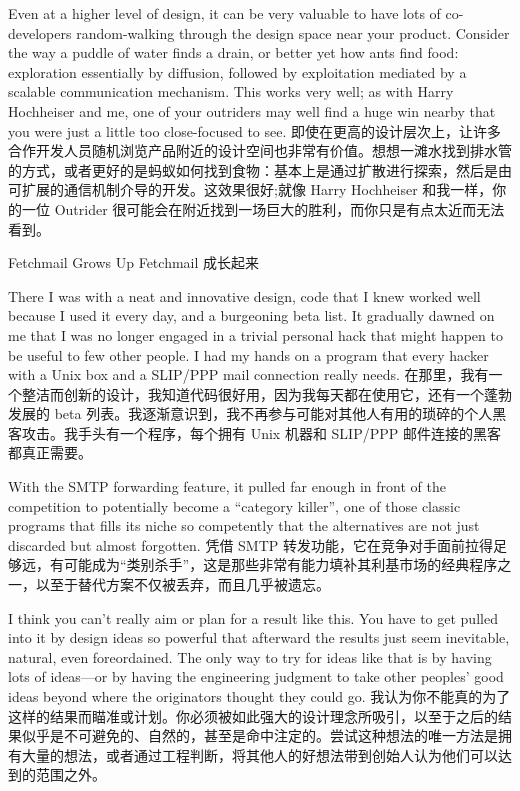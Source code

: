\documentclass[a4paper,12pt,UTF8,twoside]{ctexbook}
\begin{document}
Even at a higher level of design, it can be very valuable to have lots of co-developers random-walking through the design space near your product. Consider the way a puddle of water finds a drain, or better yet how ants find food: exploration essentially by diffusion, followed by exploitation mediated by a scalable communication mechanism. This works very well; as with Harry Hochheiser and me, one of your outriders may well find a huge win nearby that you were just a little too close-focused to see.
即使在更高的设计层次上，让许多合作开发人员随机浏览产品附近的设计空间也非常有价值。想想一滩水找到排水管的方式，或者更好的是蚂蚁如何找到食物：基本上是通过扩散进行探索，然后是由可扩展的通信机制介导的开发。这效果很好;就像 Harry Hochheiser 和我一样，你的一位 Outrider 很可能会在附近找到一场巨大的胜利，而你只是有点太近而无法看到。

Fetchmail Grows Up  Fetchmail 成长起来

There I was with a neat and innovative design, code that I knew worked well because I used it every day, and a burgeoning beta list. It gradually dawned on me that I was no longer engaged in a trivial personal hack that might happen to be useful to few other people. I had my hands on a program that every hacker with a Unix box and a SLIP/PPP mail connection really needs.
在那里，我有一个整洁而创新的设计，我知道代码很好用，因为我每天都在使用它，还有一个蓬勃发展的 beta 列表。我逐渐意识到，我不再参与可能对其他人有用的琐碎的个人黑客攻击。我手头有一个程序，每个拥有 Unix 机器和 SLIP/PPP 邮件连接的黑客都真正需要。

With the SMTP forwarding feature, it pulled far enough in front of the competition to potentially become a ``category killer'', one of those classic programs that fills its niche so competently that the alternatives are not just discarded but almost forgotten.
凭借 SMTP 转发功能，它在竞争对手面前拉得足够远，有可能成为“类别杀手”，这是那些非常有能力填补其利基市场的经典程序之一，以至于替代方案不仅被丢弃，而且几乎被遗忘。

I think you can't really aim or plan for a result like this. You have to get pulled into it by design ideas so powerful that afterward the results just seem inevitable, natural, even foreordained. The only way to try for ideas like that is by having lots of ideas—or by having the engineering judgment to take other peoples' good ideas beyond where the originators thought they could go.
我认为你不能真的为了这样的结果而瞄准或计划。你必须被如此强大的设计理念所吸引，以至于之后的结果似乎是不可避免的、自然的，甚至是命中注定的。尝试这种想法的唯一方法是拥有大量的想法，或者通过工程判断，将其他人的好想法带到创始人认为他们可以达到的范围之外。
\end{document}
